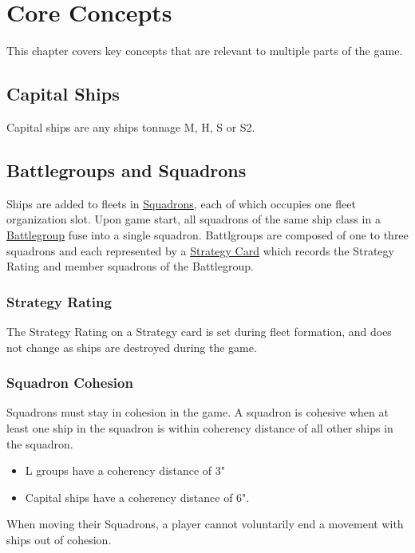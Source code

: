 \chapter{Core Concepts}

This chapter covers key concepts that are relevant to multiple parts of the game.

\section{Capital Ships}
Capital ships are any ships tonnage M, H, S or S2.

\section{Battlegroups and Squadrons}

Ships are added to fleets in \underline{Squadrons}, each of which occupies one fleet organization slot. Upon game start, all squadrons of the same ship class in a \underline{Battlegroup} fuse into a single squadron. Battlgroups are composed of one to three squadrons and each represented by a \underline{Strategy Card} which records the Strategy Rating and member squadrons of the Battlegroup.

\subsection{Strategy Rating}
The Strategy Rating on a Strategy card is set during fleet formation, and does not change as ships are destroyed during the game.

\subsection{Squadron Cohesion}
Squadrons must stay in cohesion in the game. A squadron is cohesive when at least one ship in the squadron is within coherency distance of all other ships in the squadron.

\begin{itemize}
	\item L groups have a coherency distance of 3"
	\item Capital ships have a coherency distance of 6".
\end{itemize}

When moving their Squadrons, a player cannot voluntarily end a movement with ships out of cohesion.

